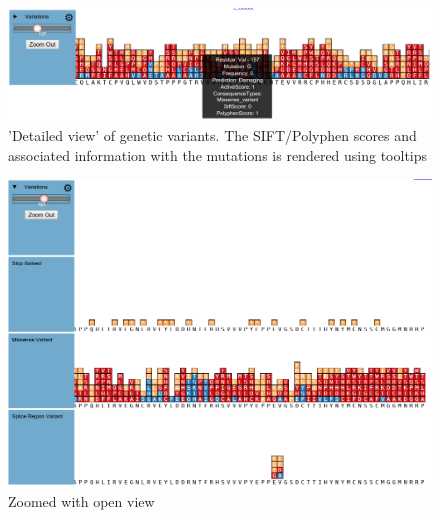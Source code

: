 \documentclass[twoside]{article}
\begin{document}
\begin{multicols}{2}
\begin{figure}
\includegraphics[width=\linewidth]{images/zoomed_withtooltip}
\caption{'Detailed view' of genetic variants. The SIFT/Polyphen scores and associated information with the mutations is rendered using tooltips}
\label{zoomedtooltip}
\end{figure}

\begin{figure}
\includegraphics[width=\linewidth]{images/zoomedopen}
\caption{Zoomed with  open view}
\label{openwithzoomed}
\end{figure}


\end{multicols}
\end{document}
